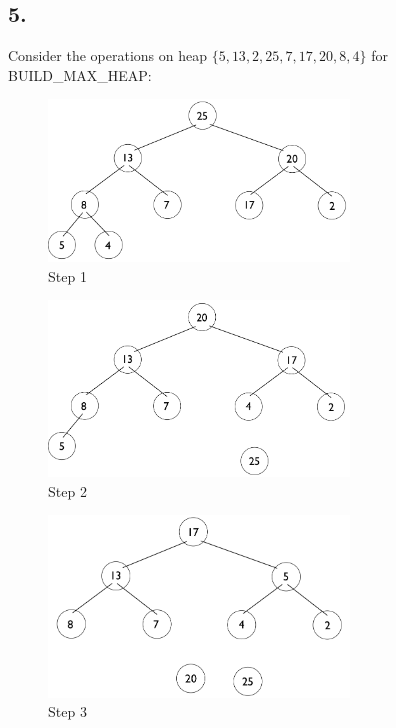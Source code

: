 \documentclass[11pt,letterpaper]{article}
\begin{document}
\pagebreak


\subsection*{5.}
Consider the operations on heap $ \{5,13,2,25,7,17,20,8,4\} $ for BUILD\_MAX\_HEAP:

\begin{figure}[!ht]

	\begin{center}
	\includegraphics[width=80mm]{images/6_4_1_1_tree.png}
	\end{center}

\caption{Step 1 }
\end{figure}

\begin{figure}[!ht]

	\begin{center}
	\includegraphics[width=80mm]{images/6_4_1_2_tree.png}
	\end{center}

\caption{Step 2 }
\end{figure}

\pagebreak

\begin{figure}[!ht]

	\begin{center}
	\includegraphics[width=80mm]{images/6_4_1_3_tree.png}
	\end{center}

\caption{Step 3 }
\end{figure}
\end{document}
